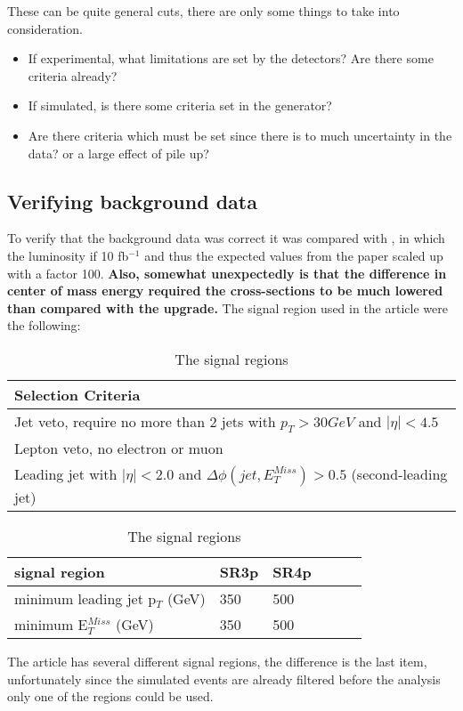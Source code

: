 These can be quite general cuts, there are only some things to take into consideration. 
\begin{itemize}
\item If experimental, what limitations are set by the detectors? Are there some criteria already?
\item If simulated, is there some criteria set in the generator?
\item Are there criteria which must be set since there is to much uncertainty in the data? or a large effect of pile up?
\end{itemize}


\subsection{Verifying background data} 	
To verify that the background data was correct it was compared with \citep{ATLAS-CONF-2012-147}, in which the luminosity if 10 fb$^{-1}$ and thus the expected values from the paper scaled up with a factor 100. \textbf{Also, somewhat unexpectedly is that the difference in center of mass energy required the cross-sections to be much lowered than compared with the upgrade.} The signal region used in the article were the following:
\begin{table}[h]
\begin{center}
\begin{tabular}{l}
\hline
Selection Criteria \\ \hline
Jet veto, require no more than 2 jets with $p_T > 30 GeV$ and $|\eta| < 4.5$ \\
Lepton veto, no electron or muon \\
Leading jet with $|\eta| < 2.0$ and $\Delta \phi (jet, E_T^{Miss})>0.5$ (second-leading jet) \\ \hline
\end{tabular}
\begin{tabular}{l l l l l l}
signal region & SR3p & SR4p \\ \hline
minimum leading jet p$_T$ (GeV) & 350 & 500 \\
minimum E$^{Miss}_T$ (GeV) & 350 & 500 \\ \hline
\end{tabular}
\label{tab:oldsr}
\caption{The signal regions}
\end{center}
\end{table}

The article has several different signal regions, the difference is the last item, unfortunately since the simulated events are already filtered before the analysis only one of the regions could be used.

